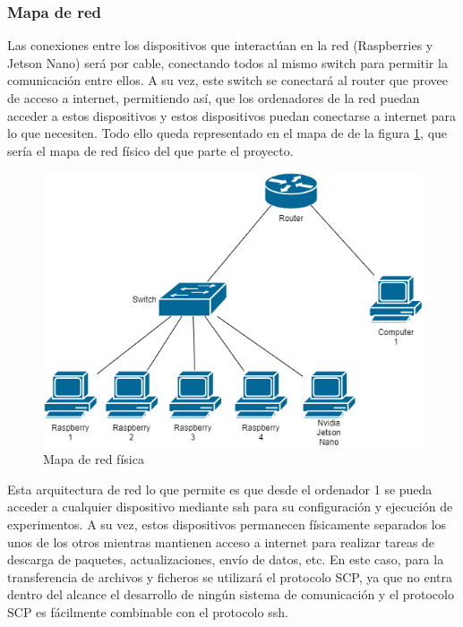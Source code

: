 \subsubsection{Mapa de red}
Las conexiones entre los dispositivos que interactúan en la red (Raspberries y Jetson Nano) será por cable, conectando todos al mismo switch para permitir la comunicación entre ellos. A su vez, este switch se conectará al router que provee de acceso a internet, permitiendo así, que los ordenadores de la red puedan acceder a estos dispositivos y estos dispositivos puedan conectarse a internet para lo que necesiten. Todo ello queda representado en el mapa de de la figura \ref{fig:MapaRed}, que sería el mapa de red físico del que parte el proyecto.
\begin{figure}[H]
    \centering
    \includegraphics[width=\textwidth]{Figuras/Network_map.png}    
    \caption{Mapa de red física} 
    \label{fig:MapaRed}
\end{figure}

Esta arquitectura de red lo que permite es que desde el ordenador 1 se pueda acceder a cualquier dispositivo mediante ssh para su configuración y ejecución de experimentos. A su vez, estos dispositivos permanecen físicamente separados los unos de los otros mientras mantienen acceso a internet para realizar tareas de descarga de paquetes, actualizaciones, envío de datos, etc. En este caso, para la transferencia de archivos y ficheros se utilizará el protocolo SCP, ya que no entra dentro del alcance el desarrollo de ningún sistema de comunicación y el protocolo SCP es fácilmente combinable con el protocolo ssh.

\pagebreak

